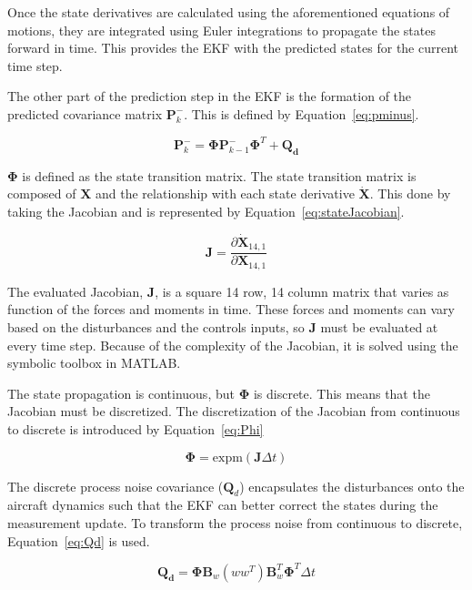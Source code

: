 Once the state derivatives are calculated using the aforementioned equations of motions, they are integrated using Euler integrations to propagate the states forward in time. This provides the EKF with the predicted states for the current time step.

The other part of the prediction step in the EKF is the formation of the predicted covariance matrix \(\mathbf{P}^-_{k}\). This is defined by Equation~\ref{eq:pminus}.

\begin{equation}\label{eq:pminus}
    \mathbf{P}^-_{k} = \mathbf{\Phi}\mathbf{P}^-_{k-1} \mathbf{\Phi}^T + \mathbf{Q_d}
\end{equation}

\( \mathbf{\Phi}\) is defined as the state transition matrix. The state transition matrix is composed of \(\mathbf{X}\) and the relationship with each state derivative \( \dot{\mathbf{X}}\). This done by taking the Jacobian and is represented by Equation~\ref{eq:stateJacobian}.

\begin{equation}\label{eq:stateJacobian}
    \mathbf{J} = \frac{\partial \dot{\mathbf{X}}_{14,1}}{\partial \mathbf{X}_{14,1}}
\end{equation}

The evaluated Jacobian, \(\mathbf{J}\), is a square 14 row, 14 column matrix that varies as function of the forces and moments in time. These forces and moments can vary based on the disturbances and the controls inputs, so \(\mathbf{J}\) must be evaluated at every time step. Because of the complexity of the Jacobian, it is solved using the symbolic toolbox in MATLAB\@.

The state propagation is continuous, but \(\mathbf{\Phi}\) is discrete. This means that the Jacobian must be discretized. The discretization of the Jacobian from continuous to discrete is introduced by Equation~\ref{eq:Phi}

\begin{equation}\label{eq:Phi}
    \mathbf{\Phi} = \textrm{expm}(\mathbf{J}\Delta t)
\end{equation}

The discrete process noise covariance (\(\mathbf{Q}_d\)) encapsulates the disturbances onto the aircraft dynamics such that the EKF can better correct the states during the measurement update. To transform the process noise from continuous to discrete, Equation~\ref{eq:Qd} is used.

\begin{equation}\label{eq:Qd}
    \mathbf{Q_d} = \mathbf{\Phi}\mathbf{B}_w \left(ww^T\right) \mathbf{B}_w^T \mathbf{\Phi}^T \Delta t
\end{equation}

